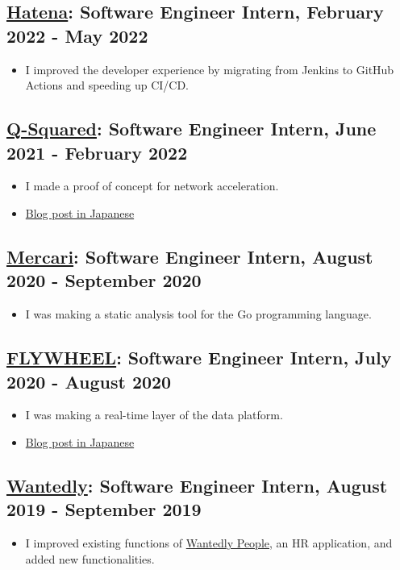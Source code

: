 \documentclass[12pt]{article}
\begin{document}
  \subsection*{\href{https://hatenacorp.jp/}{Hatena}: Software Engineer Intern, February 2022 - May 2022}
    \begin{itemize}
      \item I improved the developer experience by migrating from Jenkins to GitHub Actions and speeding up CI/CD.
    \end{itemize}
  \subsection*{\href{https://q-squared.jp}{Q-Squared}: Software Engineer Intern, June 2021 - February 2022}
    \begin{itemize}
      \item I made a proof of concept for network acceleration.
      \item \href{https://flossy-era-126.notion.site/DPDK-Potential-in-Finance-840b0d289273495192eb04d97d268eeb}{Blog post in Japanese}
    \end{itemize}
  \subsection*{\href{https://about.mercari.com/en}{Mercari}: Software Engineer Intern, August 2020 - September 2020}
    \begin{itemize}
      \item I was making a static analysis tool for the Go programming language.
    \end{itemize}
  \subsection*{\href{https://www.flywheel.jp}{FLYWHEEL}: Software Engineer Intern, July 2020 - August 2020}
    \begin{itemize}
      \item I was making a real-time layer of the data platform.
      \item \href{https://www.flywheel.jp/topics/20200917}{Blog post in Japanese}
    \end{itemize}
  \subsection*{\href{https://wantedlyinc.com/ja}{Wantedly}: Software Engineer Intern, August 2019 - September 2019}
    \begin{itemize}
      \item I improved existing functions of \href{https://people.wantedly.com/}{Wantedly People}, an HR application, and added new functionalities.
    \end{itemize}
\end{document}
